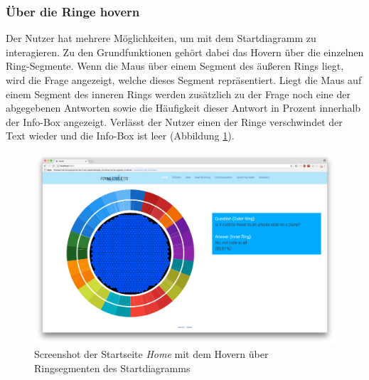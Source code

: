 \documentclass{mi-seminar}
\begin{document}
\subsubsection{Über die Ringe hovern}
Der Nutzer hat mehrere Möglichkeiten, um mit dem Startdiagramm zu interagieren. Zu den Grundfunktionen gehört dabei das Hovern über die einzelnen Ring-Segmente. Wenn die Maus über einem Segment des äußeren Rings liegt, wird die Frage angezeigt, welche dieses Segment repräsentiert. Liegt die Maus auf einem Segment des inneren Rings werden zusätzlich zu der Frage noch eine der abgegebenen Antworten sowie die Häufigkeit dieser Antwort in Prozent innerhalb der Info-Box angezeigt. Verlässt der Nutzer einen der Ringe verschwindet der Text wieder und die Info-Box ist leer (Abbildung \ref{ScStartDiagramHover}).
\begin{figure}[h]
\includegraphics[scale=0.3]{assets/start_hover_rings.png}
\caption{Screenshot der Startseite \textit{Home} mit dem Hovern über Ringsegmenten des Startdiagramms}
\label{ScStartDiagramHover}
\end{figure}
\end{document}
